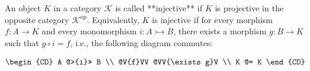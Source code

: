 An object $K$ in a category $\mathcal{K}$ is called **injective** if $K$ is projective in the opposite category $\mathcal{K}^{\text{op}}$. Equivalently, $K$ is injective if for every morphism $f: A \to K$ and every monomorphism $i: A \rightarrowtail B$, there exists a morphism $g: B \to K$ such that $g \circ i = f$, i.e., the following diagram commutes:

$$
\begin{CD}
A @>{i}>> B \\
@V{f}VV @VV{\exists g}V \\
K @= K
\end{CD}
$$
